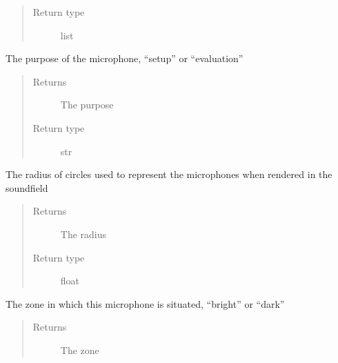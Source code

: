 \documentclass[letterpaper,10pt,english]{sphinxmanual}
\begin{document}
\begin{fulllineitems}
\begin{fulllineitems}
\begin{quote}
\begin{description}
\item[{Return type}] \leavevmode
list

\end{description}\end{quote}

\end{fulllineitems}


\begin{fulllineitems}
\label{\detokenize{source/pyzones:pyzones.Microphone.purpose}}
The purpose of the microphone, “setup” or “evaluation”
\begin{quote}\begin{description}
\item[{Returns}] \leavevmode
The purpose

\item[{Return type}] \leavevmode
str

\end{description}\end{quote}

\end{fulllineitems}


\begin{fulllineitems}
\label{\detokenize{source/pyzones:pyzones.Microphone.radius}}
The radius of circles used to represent the microphones when rendered in the soundfield
\begin{quote}\begin{description}
\item[{Returns}] \leavevmode
The radius

\item[{Return type}] \leavevmode
float

\end{description}\end{quote}

\end{fulllineitems}


\begin{fulllineitems}
\label{\detokenize{source/pyzones:pyzones.Microphone.zone}}
The zone in which this microphone is situated, “bright” or “dark”
\begin{quote}\begin{description}
\item[{Returns}] \leavevmode
The zone


\end{description}
\end{quote}
\end{fulllineitems}
\end{fulllineitems}
\end{document}
